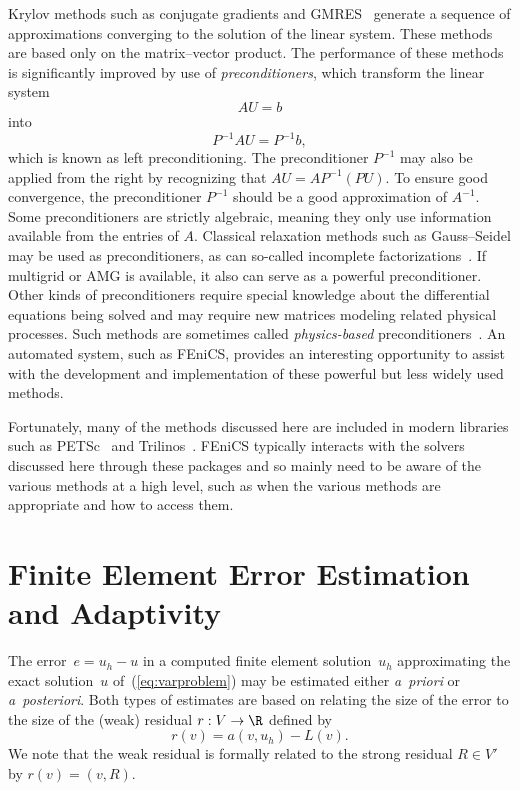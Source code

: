 Krylov methods such as conjugate gradients and
GMRES~\cite{SaadSchultz1986} generate a sequence of approximations
converging to the solution of the linear system. These methods are
based only on the matrix--vector product.  The performance of these
methods is significantly improved by use of \emph{preconditioners},
which transform the linear system
\begin{displaymath}
AU = b
\end{displaymath}
into
\begin{displaymath}
P^{-1} A U = P^{-1} b,
\end{displaymath}
which is known as left preconditioning. The preconditioner $P^{-1}$
may also be applied from the right by recognizing that $A U = A P^{-1}
(P U)$. To ensure good convergence, the preconditioner $P^{-1}$ should
be a good approximation of $A^{-1}$. Some preconditioners are strictly
algebraic, meaning they only use information available from the
entries of \( A \). Classical relaxation methods such as Gauss--Seidel
may be used as preconditioners, as can so-called incomplete
factorizations~\cite{missing}. If multigrid or AMG is available, it
also can serve as a powerful preconditioner. Other kinds of
preconditioners require special knowledge about the differential
equations being solved and may require new matrices modeling related
physical processes.  Such methods are sometimes called
\emph{physics-based} preconditioners~\cite{missing}. An automated
system, such as FEniCS, provides an interesting opportunity to assist
with the development and implementation of these powerful but less
widely used methods.


Fortunately, many of the methods discussed here are included in modern
libraries such as PETSc~\cite{BalayBuschelmanEtAl2004} and
Trilinos~\cite{HerouxBartlettEtAl2005}. FEniCS typically interacts
with the solvers discussed here through these packages and so mainly
need to be aware of the various methods at a high level, such as when
the various methods are appropriate and how to access them.

\section{Finite Element Error Estimation and Adaptivity}

The error~$e = u_h - u$ in a computed finite element solution~$u_h$
approximating the exact solution~$u$ of~(\ref{eq:varproblem}) may be
estimated either \emph{a~priori} or \emph{a~posteriori}. Both types of
estimates are based on relating the size of the error to the size of
the (weak) residual $r : V \rightarrow \R$ defined by
\begin{equation} \label{eq:residual,weak}
  r(v) = a(v, u_h) - L(v).
\end{equation}
We note that the weak residual is formally related to the strong
residual $R \in V'$ by $r(v) = (v, R)$.

